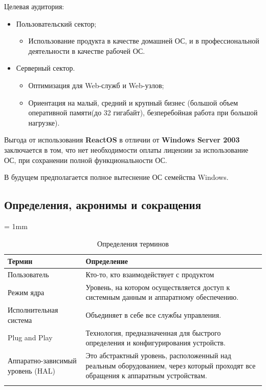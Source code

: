 Целевая аудитория:
\begin{itemize}
\item Пользовательский сектор;
\begin{itemize}
\item Использование продукта в качестве домашней ОС, и в профессиональной деятельности в качестве рабочей ОС.
\end{itemize}
\item Серверный сектор.
\begin{itemize}
\item Оптимизация для Web-служб и Web-узлов;
\item Ориентация на малый, средний и крупный бизнес (большой объем оперативной памяти(до 32 гигабайт), безперебойная работа при большой нагрузке).
\end{itemize}
\end{itemize}

Выгода от использования \textbf{ReactOS} в отличии от \textbf{Windows Server 2003} заключается в том, что нет необходимости оплаты лицензии за использование ОС, при сохранении полной функциональности ОС.

В будущем предполагается полное вытеснение ОС семейства Windows.

\subsection{Определения, акронимы и сокращения}
\tabulinesep = 1mm
\begin{longtabu} to \textwidth {|X[2, m ] |X[6, l, m ] |}\firsthline\hline
\textbf{Термин}&\textbf{Определение}\\ \hline \endfirsthead
Пользователь	&Кто-то, кто взаимодействует с продуктом\\ \hline
Режим ядра & Уровень, на котором осуществляется доступ к системным данным и аппаратному обеспечению. \\ \hline
Исполнительная система& Объединяет в себе все службы управления. \\ \hline
Plug and Play& Технология, предназначенная для быстрого определения и конфигурирования устройств. \\ \hline
Аппаратно-зависимый уровень (HAL)& Это абстрактный уровень, расположенный над реальным оборудованием, через который проходят все обращения к аппаратным устройствам. \\ \hline
\caption{Определения терминов}
\end{longtabu}

